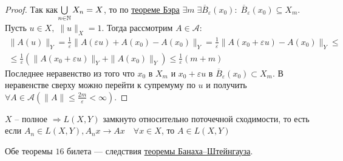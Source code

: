 \begin{proof}
Так как\(\bigcup\limits_{n \in \mathbb{N} }X_n = X\), то по \hyperref[Ber-equiv]{теореме Бэра} \(\exists m\; \exists \overline{B}_\varepsilon(x_0):\; \overline{B}_\varepsilon(x_0) \subseteq X_m \). Пусть \(u \in X, \; \|u\|_X = 1\). Тогда рассмотрим \(A \in \mathcal{A}\):
\begin{multline*}
    \|A(u)\|_Y = \frac{1}{\varepsilon} \|A(\varepsilon u) + A(x_0) - A(x_0) \|_Y = \frac{1}{\varepsilon} \|A(x_0 + \varepsilon u) - A(x_0) \|_Y \leqslant \\
    \leqslant \frac{1}{\varepsilon} \left(\|A(x_0 + \varepsilon u)\|_Y + \|A(x_0)\|_Y \right) \leqslant \frac{1}{\varepsilon}(m + m)
\end{multline*}
Последнее неравенство из того что $x_0$ в $X_m$ и $x_0 + \varepsilon u$ в $ \overline{B}_\varepsilon(x_0) \subset X_m$.
В неравенстве сверху можно перейти к супремуму по $u$ и получить \(\forall A \in \mathcal{A} \left(\|A\| \leqslant \frac{2m}{\varepsilon} < \infty \right)\).

\end{proof}

\begin{corollary}
$X$ -- полное $\Rightarrow L(X, Y)$ замкнуто относительно поточечной сходимости, то есть если $A_n \in L(X, Y), A_nx \to Ax \quad \forall x \in X$, то $A \in L(X, Y)$
\end{corollary}

\begin{note}
    Обе теоремы $16$ билета --- следствия \hyperref[Banach-Steingaus]{теоремы Банаха--Штейнгауза}.
\end{note}